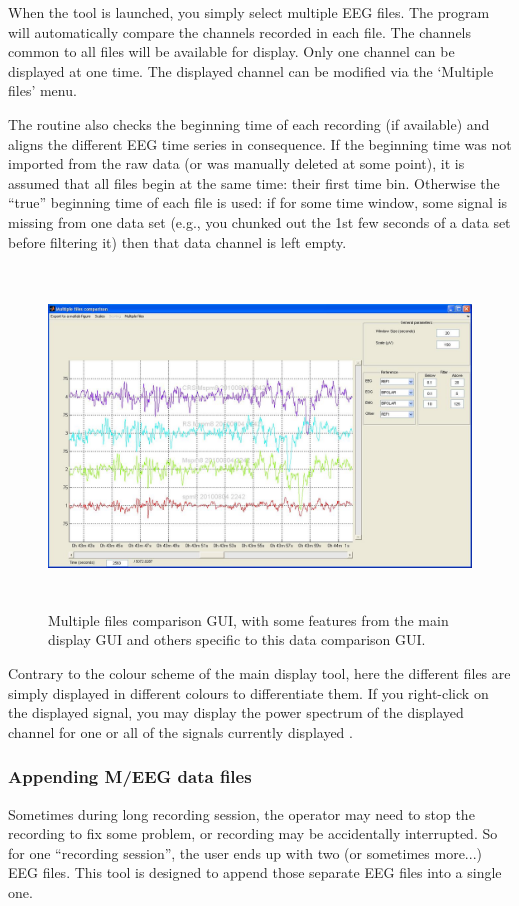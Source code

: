 \documentclass[a4paper,titlepage]{article}
\begin{document}
When the tool is launched, you simply select multiple EEG files. The program will automatically compare the channels recorded in each file. The channels common to all files will be available for display. Only one channel can be displayed at one time. The displayed channel can be modified via the `Multiple files' menu.

The routine also checks the beginning time of each recording (if available) and aligns the different EEG time series in consequence. If the beginning time was not imported from the raw data (or was manually deleted at some point), it is assumed that all files begin at the same time: their first time bin. Otherwise the ``true'' beginning time of each file is used: if for some time window, some signal is missing from one data set (e.g., you chunked out the 1st few seconds of a data set before filtering it) then that data channel is left empty.

\begin{figure}[ht]
	\centering
		\includegraphics[width=15cm,height=9cm]{images/FIG5_dis_cmp.jpg}
	\caption{Multiple files comparison GUI, with some features from the main display GUI and others specific to this data comparison GUI.
	\label{fig:TB_discmp}}
\end{figure}

Contrary to the colour scheme of the main display tool, here the different files are simply displayed in different colours to differentiate them. 
If you right-click on the displayed signal, you may display the power spectrum of the displayed channel for one or all of the signals currently displayed .

\subsubsection{Appending M/EEG data files}
\label{sec:appending}
Sometimes during long recording session, the operator may need to stop the recording to fix some problem, or recording may be accidentally interrupted. So for one ``recording session'', the user ends up with two (or sometimes more...) EEG files. This tool is designed to append those separate EEG files into a single one.
\end{document}

